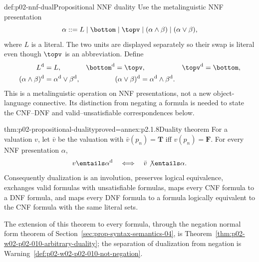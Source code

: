 \begin{hbdefinition}{def:p02-nnf-dual}{Propositional NNF duality}
Use the metalinguistic NNF presentation
\[
 \alpha ::= L\mid\bottom\mid\topv\mid(\alpha\land\beta)
             \mid(\alpha\lor\beta),
\]
where \(L\) is a literal.  The two units are displayed separately so their
swap is literal even though \(\topv\) is an abbreviation.  Define
\[
\begin{aligned}
 L^{\mathrm d}&=L,&
 \bottom^{\mathrm d}&=\topv,&
 \topv^{\mathrm d}&=\bottom,\\
 (\alpha\land\beta)^{\mathrm d}
   &=\alpha^{\mathrm d}\lor\beta^{\mathrm d},&&
 (\alpha\lor\beta)^{\mathrm d}
   =\alpha^{\mathrm d}\land\beta^{\mathrm d}.
\end{aligned}
\]
This is a metalinguistic operation on NNF presentations, not a new
object-language connective.  Its distinction from negating a formula is
needed to state the CNF--DNF and valid--unsatisfiable correspondences below.
\end{hbdefinition}

\begin{hbtheorem}{thm:p02-propositional-duality}{proved=annex:p2.1.8}{Duality theorem}
For a valuation \(v\), let \(\bar v\) be the valuation with
\(\bar v(p_n)=\mathbf T\) iff \(v(p_n)=\mathbf F\).  For every NNF
presentation \(\alpha\),
\[
 v\entails\alpha^{\mathrm d}\quad\Longleftrightarrow\quad
 \bar v\not\entails\alpha.
\]
Consequently dualization is an involution, preserves logical equivalence,
exchanges valid formulas with unsatisfiable formulas, maps every CNF formula
to a DNF formula, and maps every DNF formula to a formula logically
equivalent to the CNF formula with the same literal sets.
\end{hbtheorem}

The extension of this theorem to every formula, through the negation normal
form theorem of Section~\ref{sec:prop-syntax-semantics-04}, is
Theorem~\ref{thm:p02-w02-p02-010-arbitrary-duality}; the separation of
dualization from negation is Warning~\ref{def:p02-w02-p02-010-not-negation}.

